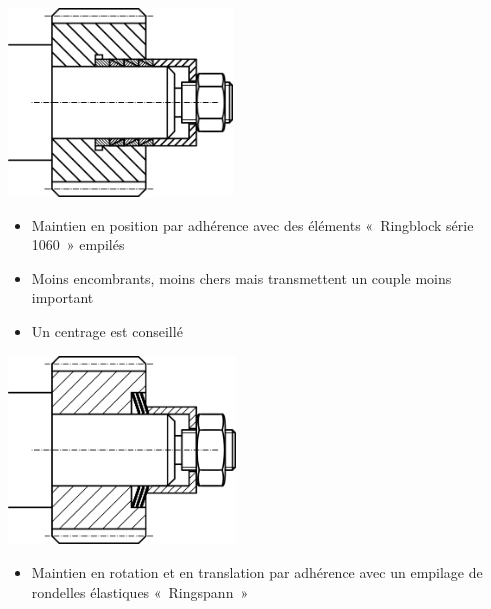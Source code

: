 \documentclass[11pt,oneside]{article}
\begin{document}
\noindent\begin{minipage}[c]{.45\linewidth}
 \begin{center}
  \includegraphics[height=5cm]{png/Fig12Bis}
 \end{center}

\begin{itemize}
\item Maintien en position par adhérence avec des éléments «~Ringblock série
1060~» empilés 
\item Moins encombrants, moins chers mais transmettent un couple moins important
\item Un centrage est conseillé
\end{itemize}
\end{minipage} \hfill
\noindent\begin{minipage}[c]{.45\linewidth}
 \begin{center}
  \includegraphics[height=5cm]{png/Fig13}
 \end{center}

\begin{itemize}
\item Maintien en rotation et en translation par adhérence avec un empilage de
rondelles élastiques «~Ringspann~»
\end{itemize} 
\end{minipage} 
\end{document}
